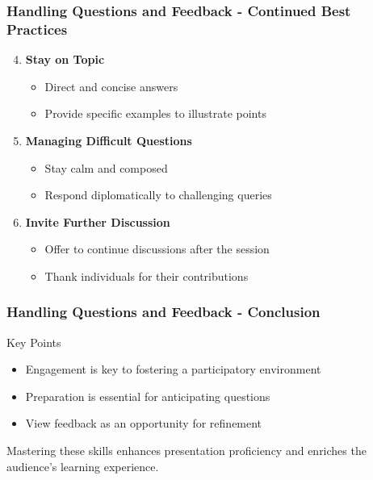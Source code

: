 \documentclass[aspectratio=169]{beamer}
\begin{document}
\begin{frame}[fragile]
    \frametitle{Handling Questions and Feedback - Continued Best Practices}
    \begin{enumerate}
        \setcounter{enumi}{3}
        \item \textbf{Stay on Topic}
        \begin{itemize}
            \item Direct and concise answers
            \item Provide specific examples to illustrate points
        \end{itemize}
        
        \item \textbf{Managing Difficult Questions}
        \begin{itemize}
            \item Stay calm and composed
            \item Respond diplomatically to challenging queries
        \end{itemize}
        
        \item \textbf{Invite Further Discussion}
        \begin{itemize}
            \item Offer to continue discussions after the session
            \item Thank individuals for their contributions
        \end{itemize}
    \end{enumerate}
\end{frame}

\begin{frame}[fragile]
    \frametitle{Handling Questions and Feedback - Conclusion}
    \begin{block}{Key Points}
        \begin{itemize}
            \item Engagement is key to fostering a participatory environment
            \item Preparation is essential for anticipating questions
            \item View feedback as an opportunity for refinement
        \end{itemize}
    \end{block}
    Mastering these skills enhances presentation proficiency and enriches the audience's learning experience.
\end{frame}
\end{document}
